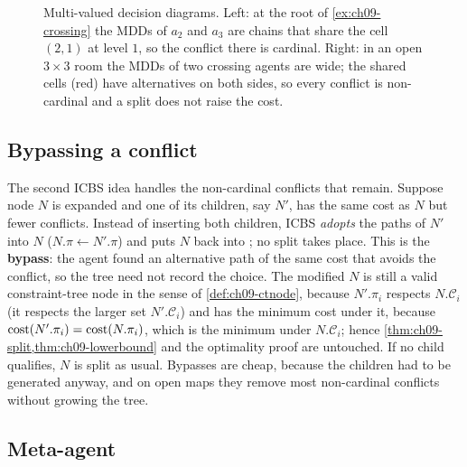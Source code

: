 \begin{figure}[tb]
  \centering
  \caption{Multi-valued decision diagrams. Left: at the root of
    \cref{ex:ch09-crossing} the MDDs of $a_2$ and $a_3$ are chains that
    share the cell $(2,1)$ at level $1$, so the conflict there is cardinal.
    Right: in an open $3 \times 3$ room the MDDs of two crossing agents are
    wide; the shared cells (red) have alternatives on both sides, so every
    conflict is non-cardinal and a split does not raise the cost.}
  \label{fig:ch09-mdd}
\end{figure}

\subsection{Bypassing a conflict}
\label{sec:ch09-bypass}

The second ICBS idea handles the non-cardinal conflicts that remain.
Suppose node $N$ is expanded and one of its children, say $N'$, has the same
cost as $N$ but fewer conflicts. Instead of inserting both children, ICBS
\emph{adopts} the paths of $N'$ into $N$ ($N.\pi \gets N'.\pi$) and puts $N$
back into \Open; no split takes place. This is the
\textbf{bypass}: the agent found an
alternative path of the same cost that avoids the conflict, so the tree need
not record the choice. The modified $N$ is still a valid constraint-tree
node in the sense of \cref{def:ch09-ctnode}, because $N'.\pi_i$ respects
$N.\mathcal{C}_i$ (it respects the larger set $N'.\mathcal{C}_i$) and has the
minimum cost under it, because $\operatorname{cost}(N'.\pi_i) = \operatorname{cost}(N.\pi_i)$, which
is the minimum under $N.\mathcal{C}_i$; hence
\cref{thm:ch09-split,thm:ch09-lowerbound} and
the optimality proof are untouched. If no child qualifies, $N$ is split as
usual. Bypasses are cheap, because the children had to be generated anyway,
and on open maps they remove most non-cardinal conflicts without growing
the tree.

\subsection{Meta-agent \cbs}
\label{sec:ch09-macbs}

